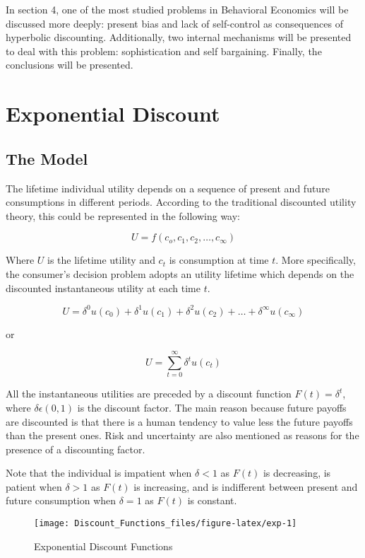 \documentclass[]{article}
\begin{document}
In section 4, one of the most studied problems in Behavioral Economics will be discussed more deeply: present bias and lack of self-control as consequences of hyperbolic discounting. Additionally, two internal mechanisms will be presented to deal with this problem: sophistication and self bargaining. Finally, the conclusions will be presented.

\hypertarget{exponential-discount}{%
\section{Exponential Discount}\label{exponential-discount}}

\hypertarget{the-model}{%
\subsection{The Model}\label{the-model}}

The lifetime individual utility depends on a sequence of present and future consumptions in different periods. According to the traditional discounted utility theory, this could be represented in the following way:

\[
U = f(c_{o}, c_{1}, c_{2},\dots, c_{\infty})
\]

Where \(U\) is the lifetime utility and \(c_{t}\) is consumption at time \(t\). More specifically, the consumer's decision problem adopts an utility lifetime which depends on the discounted instantaneous utility at each time \(t\).

\[
U = \delta^0 u(c_{0})+ \delta^1 u(c_{1}) + \delta^2 u(c_{2}) + \dots + \delta^\infty u(c_{\infty})
\]

or

\[
U = \sum_{t=0}^{\infty}\delta^t u(c_{t})
\]

All the instantaneous utilities are preceded by a discount function \(F(t) = \delta^t\), where \(\delta \epsilon(0,1)\) is the discount factor. The main reason because future payoffs are discounted is that there is a human tendency to value less the future payoffs than the present ones. Risk and uncertainty are also mentioned as reasons for the presence of a discounting factor.

Note that the individual is impatient when \(\delta<1\) as \(F(t)\) is decreasing, is patient when \(\delta>1\) as \(F(t)\) is increasing, and is indifferent between present and future consumption when \(\delta=1\) as \(F(t)\) is constant.

\begin{figure}

{\centering \texttt{[image: Discount\_Functions\_files/figure-latex/exp-1]} 

}

\caption{Exponential Discount Functions}\label{fig:exp}
\end{figure}
\end{document}
